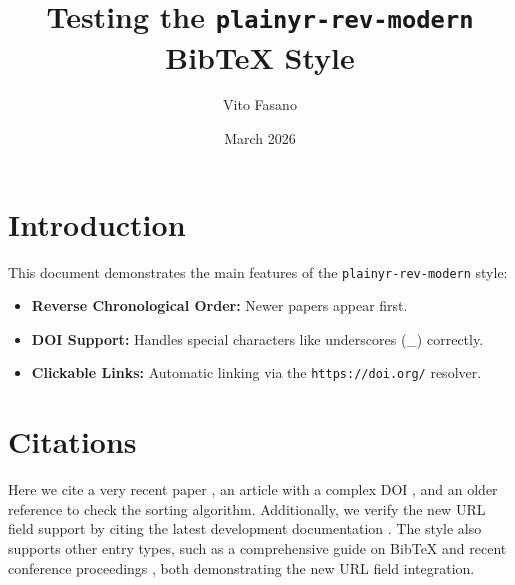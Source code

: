 \documentclass{article}
\title{Testing the \texttt{plainyr-rev-modern} BibTeX Style}
\author{Vito Fasano}
\date{March 2026}
\begin{document}
\maketitle

\section{Introduction}
This document demonstrates the main features of the \texttt{plainyr-rev-modern} style:
\begin{itemize}
    \item \textbf{Reverse Chronological Order:} Newer papers appear first.
    \item \textbf{DOI Support:} Handles special characters like underscores (\_) correctly.
    \item \textbf{Clickable Links:} Automatic linking via the \texttt{https://doi.org/} resolver.
\end{itemize}

\section{Citations}
Here we cite a very recent paper \cite{ModernApproach2026}, an article with a complex DOI \cite{UnderscoreTest2024}, and an older reference \cite{LegacyPaper1990} to check the sorting algorithm.
Additionally, we verify the new URL field support by citing the latest development documentation \cite{ModernStyle2026}.
The style also supports other entry types, such as a comprehensive guide on BibTeX \cite{LatexGuide2025} and recent conference proceedings \cite{ConferencePaper2023}, both demonstrating the new URL field integration.



\end{document}
